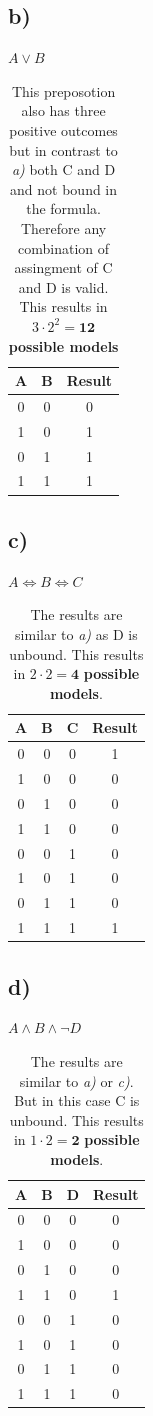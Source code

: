 \documentclass[11pt]{article}
\begin{document}
\subsection*{b)} 
$A \vee B$
\begin{table}[h]
  \begin{tabular}{c|c||c}
    A & B & Result\\
    \hline
    0 & 0 & 0 \\
    1 & 0 & 1 \\
    0 & 1 & 1 \\
    1 & 1 & 1 
  \end{tabular}
  \caption*{This preposotion also has three positive outcomes but in contrast to \textit{a)} both C and D and not bound in the formula. Therefore any combination of assingment of C and D is valid. This results in $3 \cdot 2^2 = \textbf{12}$ \textbf{possible models}}
\end{table}

\newpage

\subsection*{c)} 
$A \Leftrightarrow  B \Leftrightarrow  C$
\begin{table}[h]
  \begin{tabular}{c|c|c||c}
    A & B & C & Result\\
    \hline
    0 & 0 & 0 & 1 \\
    1 & 0 & 0 & 0 \\
    0 & 1 & 0 & 0 \\
    1 & 1 & 0 & 0 \\
    0 & 0 & 1 & 0 \\
    1 & 0 & 1 & 0 \\
    0 & 1 & 1 & 0 \\
    1 & 1 & 1 & 1
  \end{tabular}
  \caption*{The results are similar to \textit{a)} as D is unbound. This results in $2 \cdot 2 = \textbf{4}$ \textbf{possible models}.}
\end{table}

\subsection*{d)} 
$A \wedge  B \wedge \neg D$
\begin{table}[h]
  \begin{tabular}{c|c|c||c}
    A & B & D & Result\\
    \hline
    0 & 0 & 0 & 0 \\
    1 & 0 & 0 & 0 \\
    0 & 1 & 0 & 0 \\
    1 & 1 & 0 & 1 \\
    0 & 0 & 1 & 0 \\
    1 & 0 & 1 & 0 \\
    0 & 1 & 1 & 0 \\
    1 & 1 & 1 & 0
  \end{tabular}
  \caption*{The results are similar to \textit{a)} or \textit{c)}. But in this case C is unbound. This results in $1 \cdot 2 = \textbf{2}$ \textbf{possible models}.}
\end{table}
\end{document}
